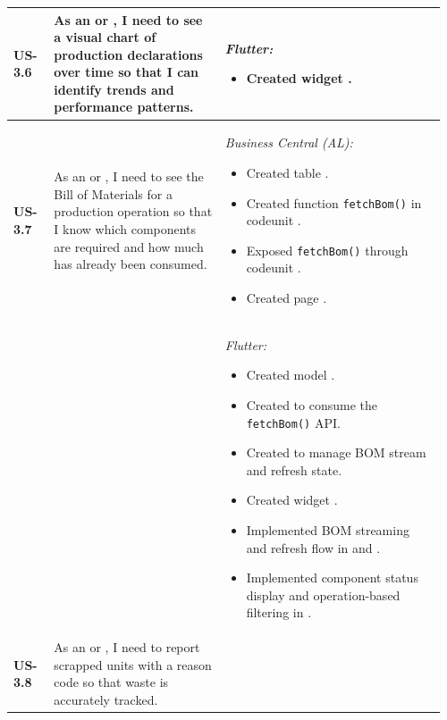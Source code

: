 \begin{longtable}{@{} P{0.09\linewidth} P{0.38\linewidth} P{0.49\linewidth} @{}}
	\textbf{US-3.6}
	& As an  or , I need to see a visual
	chart of production declarations over time so that I can identify trends
	and performance patterns.
	& \noindent\textit{Flutter:}
	\begin{itemize}[noitemsep, topsep=0pt, partopsep=0pt, leftmargin=*]
		\item Created widget .
	\end{itemize}\\
	\midrule
	\textbf{US-3.7}
	& As an  or , I need to see the
	Bill of Materials for a production operation so that I know which
	components are required and how much has already been consumed.
	& \noindent\textit{Business Central (AL):}
	\begin{itemize}[noitemsep, topsep=0pt, partopsep=0pt, leftmargin=*]
		\item Created table .
		\item Created function \texttt{fetchBom()} in codeunit .
		\item Exposed \texttt{fetchBom()} through codeunit .
		\item Created page .
	\end{itemize}
\\ & &
	\noindent\textit{Flutter:}
	\begin{itemize}[noitemsep, topsep=0pt, partopsep=0pt, leftmargin=*]
		\item Created model .
		\item Created  to consume the \texttt{fetchBom()} API.
		\item Created  to manage BOM stream and refresh state.
		\item Created widget .
		\item Implemented BOM streaming and refresh flow in  and .
		\item Implemented component status display and operation-based filtering in .
	\end{itemize}\\
	\midrule
	\textbf{US-3.8}
	& As an  or , I need to report
	scrapped units with a reason code so that waste is accurately tracked.

\end{longtable}

